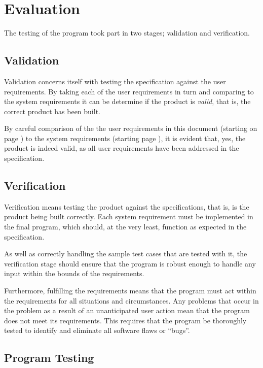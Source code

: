 
\section{Evaluation}

The testing of the program took part in two stages; validation and
verification. 

\subsection{Validation}

Validation concerns itself with testing the specification against the user
requirements. By taking each of the user requirements in turn and comparing to
the system requirements it can be determine if the product is \emph{valid},
that is, the correct product has been built. 

By careful comparison of the the user requirements in this document (starting
on page \pageref{userreqs}) to the system requirements (starting page
\pageref{sysreqs}), it is evident that, yes, the product is indeed valid, as
all user requirements have been addressed in the specification.

\subsection{Verification}

Verification means testing the product against the specifications, that is, is
the product being built correctly. Each system requirement must be implemented
in the final program, which should, at the very least, function as expected in
the specification. 

As well as correctly handling the sample test cases that are tested with it,
the verification stage should ensure that the program is robust enough to
handle any input within the bounds of the requirements.

Furthermore, fulfilling the requirements means that the program must act within
the requirements for all situations and circumstances. Any problems that occur
in the problem as a result of an unanticipated user action mean that the
program does not meet its requirements. This requires that the program be
thoroughly tested to identify and eliminate all software flaws or ``bugs''.

\subsection{Program Testing}

